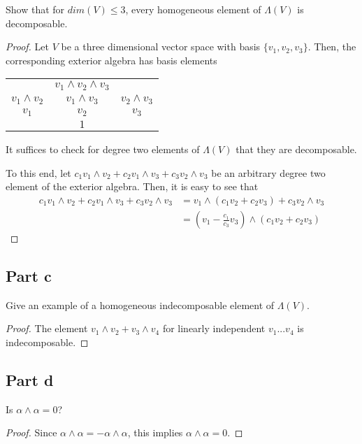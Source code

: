 \documentclass[paper=a4, fontsize=11pt]{scrartcl} %
\numberwithin{equation}{section} %
\numberwithin{figure}{section} %
\numberwithin{table}{section} %
\begin{document}
Show that for $dim(V) \leq 3$, every homogeneous element of $\Lambda (V)$ is decomposable.

\begin{proof}

Let $V$ be a three dimensional vector space with basis $\{v_1, v_2, v_3\}$.
Then, the corresponding exterior algebra has basis elements
\\
\begin{center}
\begin{tabular}{c c c}
                & $v_1 \wedge v_2 \wedge v_3$ &\\
$v_1 \wedge v_2$  & $v_1 \wedge v_3$  & $v_2 \wedge v_3$\\
$v_1$             & $v_2$               & $v_3$\\
                  & $1$ &
\end{tabular}
\end{center}

It suffices to check for degree two elements of $\Lambda(V)$ that they are decomposable.

To this end, let $c_1 v_1 \wedge v_2 + c_2 v_1 \wedge v_3 + c_3 v_2 \wedge v_3$ be an arbitrary
degree two element of the exterior algebra.
Then, it is easy to see that 
\[
\begin{aligned}
c_1 v_1 \wedge v_2 + c_2 v_1 \wedge v_3 + c_3 v_2 \wedge v_3 & = v_1 \wedge (c_1 v_2 + c_2 v_3) + c_3 v_2 \wedge v_3\\
& = (v_1 -\frac{c_1}{c_3}v_3) \wedge (c_1v_2 + c_2v_3)
\end{aligned}
\]

\end{proof}

\subsection{Part c}

Give an example of a homogeneous indecomposable element of $\Lambda(V)$.

\begin{proof}
The element $v_1 \wedge v_2 + v_3 \wedge v_4$ for linearly independent $v_1...v_4$ is indecomposable.
\end{proof}

\subsection{Part d}

Is $\alpha \wedge \alpha = 0$?

\begin{proof}
Since $\alpha \wedge \alpha = -\alpha \wedge \alpha$, this implies $\alpha \wedge \alpha =0$.
\end{proof}
\end{document}
